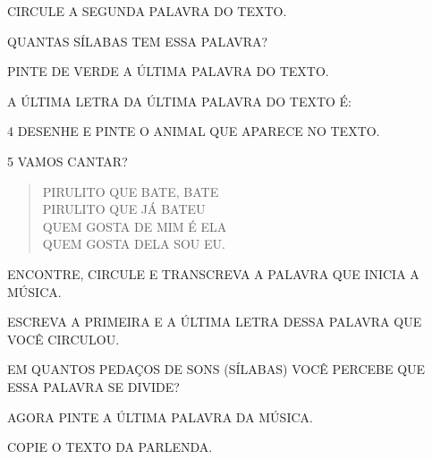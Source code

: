 \begin{escolha}
\item CIRCULE A SEGUNDA PALAVRA DO TEXTO.

\item QUANTAS SÍLABAS TEM ESSA PALAVRA?


\item PINTE DE VERDE A ÚLTIMA PALAVRA DO TEXTO.

\item A ÚLTIMA LETRA DA ÚLTIMA PALAVRA DO TEXTO É:
\end{escolha}

\pagebreak

\num{4} DESENHE E PINTE O ANIMAL QUE APARECE NO TEXTO.

\begin{mdframed}[linewidth=2pt,linecolor=salmao,roundcorner=2pt]
\vspace{20cm}
\end{mdframed}

\pagebreak
\num{5} VAMOS CANTAR?


\begin{myquote}
\begin{verse}
PIRULITO QUE BATE, BATE\\
PIRULITO QUE JÁ BATEU\\
QUEM GOSTA DE MIM É ELA\\
QUEM GOSTA DELA SOU EU.
\end{verse}
\end{myquote}

\begin{escolha}
\item ENCONTRE, CIRCULE E TRANSCREVA A PALAVRA QUE INICIA A MÚSICA.


\item ESCREVA A PRIMEIRA E A ÚLTIMA LETRA DESSA PALAVRA QUE VOCÊ CIRCULOU.


\item EM QUANTOS PEDAÇOS DE SONS (SÍLABAS) VOCÊ PERCEBE QUE ESSA PALAVRA SE DIVIDE?


\item AGORA PINTE A ÚLTIMA PALAVRA DA MÚSICA.

\item COPIE O TEXTO DA PARLENDA.

\end{escolha}

